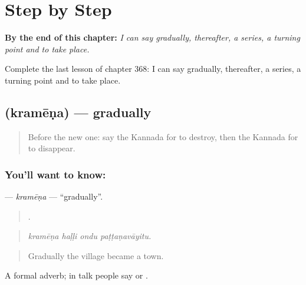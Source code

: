 
\chapter{Step by Step}
\label{ch:ka-step-by-step}

\begin{chapteropening}
\textbf{By the end of this chapter:} \emph{I can say gradually, thereafter, a series, a turning point and to take place.}

Complete the last lesson of chapter 368: I can say gradually, thereafter, a series, a turning point and to take place.
\end{chapteropening}

\section[\texorpdfstring{\kn{ಕ್ರಮೇಣ} (kramēṇa)}{ಕ್ರಮೇಣ (kramēṇa)}]{ (kramēṇa) — gradually}

\label{lesson:KA-C368-kramena}



\begin{quote}
Before the new one: say the Kannada for to destroy, then the Kannada for to disappear.
\end{quote}

\subsection*{You'll want to know: }
\textbf{} — \emph{kramēṇa} — \textquotedblleft{}gradually\textquotedblright{}.

\begin{quote}
   .
\end{quote}

\begin{quote}
\emph{kramēṇa haḷḷi ondu paṭṭaṇavāyitu.}
\end{quote}

\begin{quote}
Gradually the village became a town.
\end{quote}

A formal adverb; in talk people say  or  .

